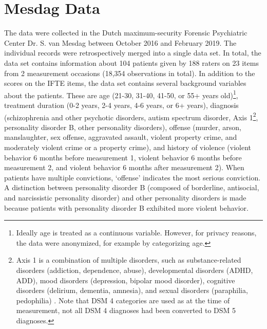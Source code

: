 \documentclass[a4paper,11pt]{article}
\newcommand{\DB}[1]{\todo[inline, color=colorDon,caption={}]{DB: {#1}}}
\begin{document}
\section{Mesdag Data}
The data were collected in the Dutch maximum-security Forensic Psychiatric Center Dr. S. van Mesdag between October 2016 and February 2019.
The individual records were retrospectively merged into a single data set. 
In total, the data set contains information about 104 patients given by 188 raters on 23 items from 2 measurement occasions (18,354 observations in total).
In addition to the scores on the IFTE items, the data set contains several background variables about the patients.
These are age (21-30, 31-40, 41-50, or 55+ years old)\footnote{Ideally age is treated as a continuous variable. However, for privacy reasons, the data were anonymized, for example by categorizing age.}, treatment duration (0-2 years, 2-4 years, 4-6 years, or 6+ years), diagnosis (schizophrenia and other psychotic disorders, autism spectrum disorder, Axis 1\footnote{Axis 1 is a combination of multiple disorders, such as substance-related disorders (addiction, dependence, abuse), developmental disorders (ADHD, ADD),  mood disorders (depression, bipolar mood disorder), cognitive disorders (delirium, dementia, amnesia), and sexual disorders (paraphilia, pedophilia) \parencite{segal2010diagnostic}. Note that DSM 4 categories are used as at the time of measurement, not all DSM 4 diagnoses had been converted to DSM 5 diagnoses.}, personality disorder B, other personality disorders), offense (murder, arson, manslaughter, sex offense, aggravated assault, violent property crime, and moderately violent crime or a property crime), and history of violence (violent behavior 6 months before measurement 1, violent behavior 6 months before measurement 2, and violent behavior 6 months after measurement 2). When patients have multiple convictions, `offense' indicates the most serious conviction. A distinction between personality disorder B (composed of borderline, antisocial, and narcissistic personality disorder) and other personality disorders is made because patients with personality disorder B exhibited more violent behavior.
\end{document}
